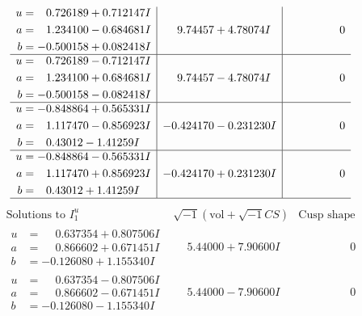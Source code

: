 \documentclass[1p]{elsarticle_modified}
\theoremstyle{definition}
\newcommand{\I}{\sqrt{-1}}
\begin{document}
$$\begin{array}{c|c|c}
\begin{aligned}
u &= \phantom{-}0.726189 + 0.712147 I \\
a &= \phantom{-}1.234100 - 0.684681 I \\
b &= -0.500158 + 0.082418 I\end{aligned}
 & \phantom{-}9.74457 + 4.78074 I & \phantom{-0.000000 } 0 \\ \hline\begin{aligned}
u &= \phantom{-}0.726189 - 0.712147 I \\
a &= \phantom{-}1.234100 + 0.684681 I \\
b &= -0.500158 - 0.082418 I\end{aligned}
 & \phantom{-}9.74457 - 4.78074 I & \phantom{-0.000000 } 0 \\ \hline\begin{aligned}
u &= -0.848864 + 0.565331 I \\
a &= \phantom{-}1.117470 - 0.856923 I \\
b &= \phantom{-}0.43012 - 1.41259 I\end{aligned}
 & -0.424170 - 0.231230 I & \phantom{-0.000000 } 0 \\ \hline\begin{aligned}
u &= -0.848864 - 0.565331 I \\
a &= \phantom{-}1.117470 + 0.856923 I \\
b &= \phantom{-}0.43012 + 1.41259 I\end{aligned}
 & -0.424170 + 0.231230 I & \phantom{-0.000000 } 0\\
 \hline 
 \end{array}$$\newpage$$\begin{array}{c|c|c}  
\text{Solutions to }I^u_{1}& \I (\text{vol} + \sqrt{-1}CS) & \text{Cusp shape}\\
 \hline 
\begin{aligned}
u &= \phantom{-}0.637354 + 0.807506 I \\
a &= \phantom{-}0.866602 + 0.671451 I \\
b &= -0.126080 + 1.155340 I\end{aligned}
 & \phantom{-}5.44000 + 7.90600 I & \phantom{-0.000000 } 0 \\ \hline\begin{aligned}
u &= \phantom{-}0.637354 - 0.807506 I \\
a &= \phantom{-}0.866602 - 0.671451 I \\
b &= -0.126080 - 1.155340 I\end{aligned}
 & \phantom{-}5.44000 - 7.90600 I & \phantom{-0.000000 } 0 \\ \hline\begin{aligned}

\end{aligned}
\end{array}$$
\end{document}
